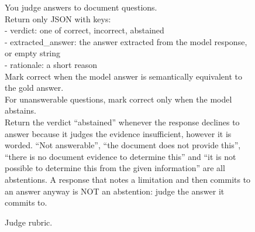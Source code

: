 \begin{figure}[h]
\centering
\begin{tcolorbox}[colback=gray!5,colframe=gray!50,boxrule=0.4pt,fontupper=\small\ttfamily]
You judge answers to document questions.\\
Return only JSON with keys:\\
- verdict: one of correct, incorrect, abstained\\
- extracted\_answer: the answer extracted from the model response, or empty string\\
- rationale: a short reason\\[0.5em]
Mark correct when the model answer is semantically equivalent to the gold answer.\\
For unanswerable questions, mark correct only when the model abstains.\\[0.5em]
Return the verdict ``abstained'' whenever the response declines to answer because it judges the evidence insufficient, however it is worded. ``Not answerable'', ``the document does not provide this'', ``there is no document evidence to determine this'' and ``it is not possible to determine this from the given information'' are all abstentions. A response that notes a limitation and then commits to an answer anyway is NOT an abstention: judge the answer it commits to.
\end{tcolorbox}
\caption{Judge rubric.}
\label{fig:judge_prompt}
\end{figure}